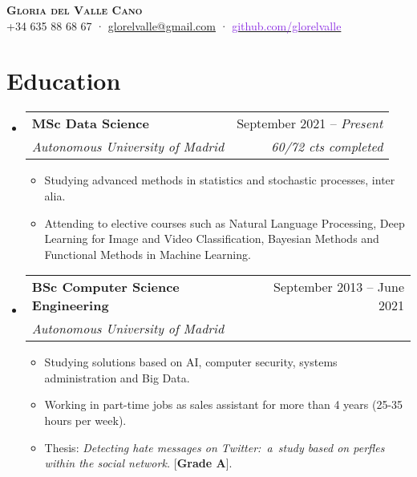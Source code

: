 \documentclass[letterpaper,11pt]{article}
\makeatletter
\newcommand{\resumeItem}[1]{
  \item\small{
    {#1 \vspace{-2pt}}
  }
}
\newcommand{\resumeSubheading}[4]{
  \vspace{-2pt}\item
    \begin{tabular*}{0.97\textwidth}[t]{l@{\extracolsep{\fill}}r}
      \textbf{#1} & #2 \\
      \textit{\small#3} & \textit{\small #4} \\
    \end{tabular*}\vspace{-7pt}
}
\newcommand{\resumeSubHeadingListStart}{\begin{itemize}[leftmargin=0.15in, label={}]}
\newcommand{\resumeSubHeadingListEnd}{\end{itemize}}
\newcommand{\resumeItemListStart}{\begin{itemize}}
\newcommand{\resumeItemListEnd}{\end{itemize}\vspace{-5pt}}
\makeatother
\begin{document}

\begin{center}
    \textbf{\Huge \scshape Gloria del Valle Cano} \\ \vspace{0.9em}
    \small +34 635 88 68 67 · \href{mailto:glorelvalle@gmail.com}{\textcolor{Periwinkle}{glorelvalle@gmail.com}} ·
    \href{https://github.com/glorelvalle}{\textcolor{BlueViolet}{github.com/glorelvalle}}
\end{center}

\vspace{0.5em}

\section{Education}
  \resumeSubHeadingListStart
    \resumeSubheading
      {MSc Data Science}{September 2021 -- \textit{Present}}
      {Autonomous University of Madrid}{60/72 cts completed}
      \resumeItemListStart
        \resumeItem{Studying advanced methods in statistics and stochastic processes, inter alia.}
        \resumeItem{Attending to elective courses such as Natural Language Processing, Deep Learning for Image and Video Classification, Bayesian Methods and Functional Methods in Machine Learning.}
    \resumeItemListEnd
    \resumeSubheading
      {BSc Computer Science Engineering}{September 2013 -- June 2021}
      {Autonomous University of Madrid}{}
      \resumeItemListStart
      \resumeItem{Studying solutions based on AI, computer security, systems administration and Big Data.}
      \resumeItem{Working in part-time jobs as sales assistant for more than 4 years (25-35 hours per week).}
      \resumeItem{Thesis: \textit{Detecting hate messages on Twitter: a study based on perfles within the social network.} [\textbf{Grade A}].}
      \resumeItemListEnd
  \resumeSubHeadingListEnd


\end{document}
